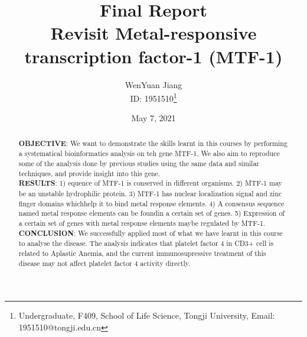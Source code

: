 \documentclass[en,black,12pt,normal]{elegantpaper}
\title{Final Report\\Revisit Metal-responsive transcription factor-1 (MTF-1)}
\author{WenYuan Jiang\\ID: 1951510\thanks{Undergraduate, F409, School of Life Science, Tongji University, Email: 1951510@tongji.edu.cn}}
\institute{School of Life Science, Tongji University}
\date{May 7, 2021}
\begin{document}
\maketitle
\begin{abstract}
\textbf{OBJECTIVE}: We want to demonstrate the skills learnt in this courses by performing a systematical bioinformatics analysis on teh gene MTF-1. We also aim to reproduce some of the analysis done by previous studies using the same data and similar techniques, and provide insight into this gene.\\
\textbf{RESULTS}: 1) equence of MTF-1 is conserved in different organisms. 2) MTF-1 may be an unstable hydrophilic protein. 3) MTF-1 has nuclear localization signal and zinc finger domains whichhelp it to bind metal response elements. 4) A consensus sequence named metal response elements can be foundin a certain set of genes. 5) Expression of a certain set of genes with metal response elements maybe regulated by MTF-1. \\
\textbf{CONCLUSION}: We successfully applied most of what we have learnt in this course to analyse the disease. The analysis indicates that platelet factor 4 in CD3+ cell is related to Aplastic Anemia, and the current immunosupressive treatment of this disease may not affect platelet factor 4 activity directly. 
\end{abstract}





%
{}
\end{document}
